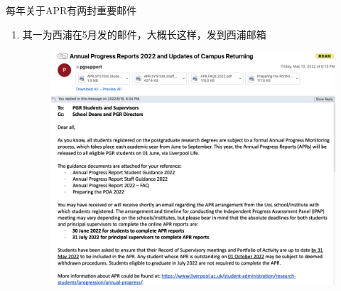 每年关于APR有两封重要邮件
\begin{enumerate}
    \item 
        \begin{minipage}{0.3\textwidth}
            其一为西浦在5月发的邮件，大概长这样，发到西浦邮箱
        \end{minipage}
        \begin{minipage}{0.63\textwidth}
            \begin{figure}[H]
                \includegraphics[width=0.95\columnwidth, right]{author-folder/Kai.Wu/APR_email.png}
            \end{figure}
        \end{minipage}


\end{enumerate}
